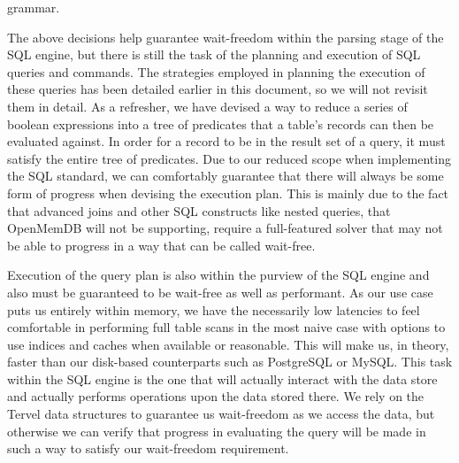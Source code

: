 \documentclass[letterpaper, 12pt]{article}
\begin{document}
  grammar.
  \par\vspace{\baselineskip}
  The above decisions help guarantee wait-freedom within the parsing stage of the SQL engine, but there
  is still the task of the planning and execution of SQL queries and commands. The strategies employed in
  planning the execution of these queries has been detailed earlier in this document, so we will not 
  revisit them in detail. As a refresher, we have devised a way to reduce a series of boolean expressions
  into a tree of predicates that a table's records can then be evaluated against. In order for a record
  to be in the result set of a query, it must satisfy the entire tree of predicates. Due to our reduced scope
  when implementing the SQL standard, we can comfortably guarantee that there will always be some form 
  of progress when devising the execution plan. This is mainly due to the fact that advanced joins and 
  other SQL constructs like nested queries, that OpenMemDB will not be supporting, require a full-featured 
  solver that may not be able to progress in a way that can be called wait-free.
  \par\vspace{\baselineskip}
  Execution of the query plan is also within the purview of the SQL engine and also must be guaranteed to be
  wait-free as well as performant. As our use case puts us entirely within memory, we have the necessarily low
  latencies to feel comfortable in performing full table scans in the most naive case with options to 
  use indices and caches when available or reasonable. This will make us, in theory, faster than our disk-based
  counterparts such as PostgreSQL or MySQL. This task within the SQL engine is the one that will actually
  interact with the data store and actually performs operations upon the data stored there. We rely on the Tervel
  data structures to guarantee us wait-freedom as we access the data, but otherwise we can verify that
  progress in evaluating the query will be made in such a way to satisfy our wait-freedom requirement.
  
\end{document}
